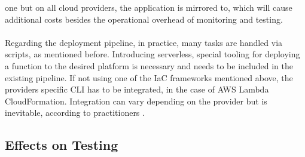 \documentclass[a4paper,11pt, pagesize]{scrartcl}
\begin{document}
\begin{spacing}{1.2}
one but on all cloud providers, the application is mirrored to, which will cause additional costs besides the operational overhead of monitoring and testing.\\\\ Regarding the deployment pipeline, in practice, many tasks are handled via scripts, as mentioned before. Introducing serverless, special tooling for deploying a function to the desired platform is necessary and needs to be included in the existing pipeline. If not using one of the IaC frameworks mentioned above, the providers specific CLI has to be integrated, in the case of AWS Lambda CloudFormation. Integration can vary depending on the provider but is inevitable, according to practitioners \cite{ivanov2018implementation}.
\subsection{Effects on Testing}

\end{spacing}
\end{document}
